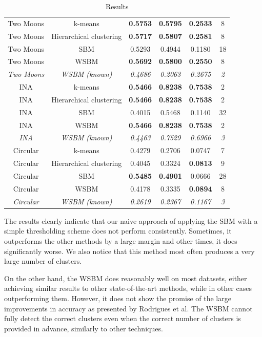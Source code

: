 \documentclass[conference]{IEEEtran}
\begin{document}
\begin{table}[ht]
\begin{tabular}{c | c | c c c | c}
    Two Moons & k-means & \textbf{0.5753} & \textbf{0.5795} & \textbf{0.2533} & 8 \\
    Two Moons & Hierarchical clustering & \textbf{0.5717} & \textbf{0.5807} & \textbf{0.2581} & 8 \\
    Two Moons & SBM & 0.5293 & 0.4944 & 0.1180 & 18 \\
    Two Moons & WSBM & \textbf{0.5692} & \textbf{0.5800} & \textbf{0.2550} & 8 \\
    \textit{Two Moons} & \textit{WSBM (known)} & \textit{0.4686} & \textit{0.2063} & \textit{0.2675} & \textit{2} \\
    \hline
    INA & k-means & \textbf{0.5466} & \textbf{0.8238} & \textbf{0.7538} & 2 \\
    INA & Hierarchical clustering  & \textbf{0.5466} & \textbf{0.8238} & \textbf{0.7538} & 2 \\
    INA & SBM & 0.4015 & 0.5468 & 0.1140 & 32 \\
    INA & WSBM & \textbf{0.5466} & \textbf{0.8238} & \textbf{0.7538} & 2 \\
    \textit{INA} & \textit{WSBM (known)} & \textit{0.4463} & \textit{0.7529} & \textit{0.6966} & \textit{3} \\
    \hline
    Circular & k-means & 0.4279 & 0.2706 & 0.0747 & 7 \\
    Circular & Hierarchical clustering & 0.4045 & 0.3324 & \textbf{0.0813} & 9 \\
    Circular & SBM & \textbf{0.5485} & \textbf{0.4901} & 0.0666 & 28 \\
    Circular & WSBM & 0.4178 & 0.3335 & \textbf{0.0894} & 8 \\
    \textit{Circular} & \textit{WSBM (known)} & \textit{0.2619} & \textit{0.2367} & \textit{0.1167} & \textit{3} \\
  \end{tabular}
  \caption{Results}
  \label{tab:results}
\end{table}

The results clearly indicate that our naive approach of applying the SBM with a simple thresholding scheme does not perform consistently. Sometimes, it outperforms the other methods by a large margin and other times, it does significantly worse. We also notice that this method most often produces a very large number of clusters.

On the other hand, the WSBM does reasonably well on most datasets, either achieving similar results to other state-of-the-art methods, while in other cases outperforming them. However, it does not show the promise of the large improvements in accuracy as presented by Rodrigues et al. The WSBM cannot fully detect the correct clusters even when the correct number of clusters is provided in advance, similarly to other techniques.
\end{document}
